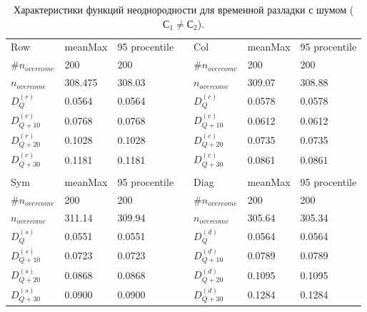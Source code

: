 \documentclass[specialist, substylefile = spbu.rtx,
			   subf, href, 12pt]{disser}
\begin{document}
\newpage
\begin{table}[!hhh]
	\caption{Характеристики функций неоднородности для временной разладки с шумом ($С_1 \neq С_2$).}
	\begin{tabular}{lllllll}
		Row & meanMax & 95 procentile &  & Col & meanMax & 95 procentile \\
		$\#n_{overcome}$ & 200 & 200 &  & $\#n_{overcome}$ & 200 & 200 \\
		$n_{overcome}$ & 308.475 & 308.03 &  & $n_{overcome}$ & 309.07 & 308.88 \\
		$D_Q^{(r)}$ & 0.0564 & 0.0564 &  & $D_Q^{(c)}$ & 0.0578 & 0.0578 \\
		$D_{Q+10}^{(r)}$ & 0.0768 & 0.0768 &  & $D_{Q+10}^{(c)}$ & 0.0612 & 0.0612 \\
		$D_{Q+20}^{(r)}$ & 0.1028 & 0.1028 &  & $D_{Q+20}^{(c)}$ & 0.0735 & 0.0735 \\
		$D_{Q+30}^{(r)}$ & 0.1181 & 0.1181 &  & $D_{Q+30}^{(c)}$ & 0.0861 & 0.0861 \\
		&  &  &  &  &  &  \\
		Sym & meanMax & 95 procentile &  & Diag & meanMax & 95 procentile \\
		$\#n_{overcome}$ & 200 & 200 &  & $\#n_{overcome}$ & 200 & 200 \\
		$n_{overcome}$ & 311.14 & 309.94 &  & $n_{overcome}$ & 305.64 & 305.34 \\
		$D_Q^{(s)}$ & 0.0551 & 0.0551 &  & $D_Q^{(d)}$ & 0.0564 & 0.0564 \\
		$D_{Q+10}^{(s)}$ & 0.0723 & 0.0723 &  & $D_{Q+10}^{(d)}$ & 0.0789 & 0.0789 \\
		$D_{Q+20}^{(s)}$ & 0.0868 & 0.0868 &  & $D_{Q+20}^{(d)}$ & 0.1095 & 0.1095 \\
		$D_{Q+30}^{(s)}$ & 0.0900 & 0.0900 &  & $D_{Q+30}^{(d)}$ & 0.1284 & 0.1284
	\end{tabular}
	\label{tab:TemporaryHeterogeneityNoisedAmplitude}
\end{table}
\end{document}
